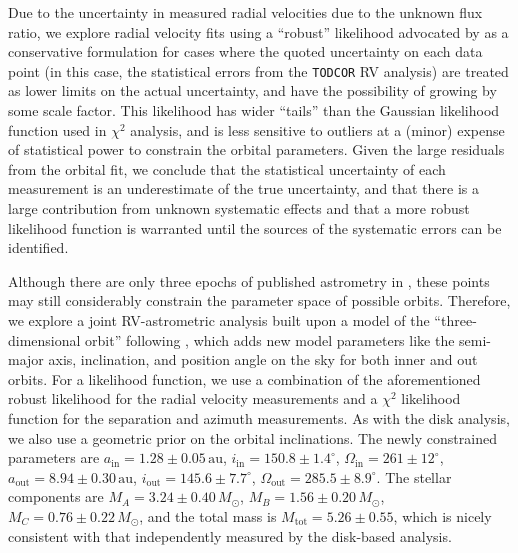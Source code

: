 \documentclass[twocolumn]{aastex61}
\begin{document}
Due to the uncertainty in measured radial velocities due to the unknown flux ratio, we explore radial velocity fits using a ``robust'' likelihood advocated by \citet[Sec. 8.3.1]{sivia06} as a conservative formulation for cases where the quoted uncertainty on each data point (in this case, the statistical errors from the \texttt{TODCOR} RV analysis) are treated as lower limits on the actual uncertainty, and have the possibility of growing by some scale factor. This likelihood has wider ``tails'' than the Gaussian likelihood function used in $\chi^2$ analysis, and is less sensitive to outliers at a (minor) expense of statistical power to constrain the orbital parameters. Given the large residuals from the orbital fit, we conclude that the statistical uncertainty of each measurement is an underestimate of the true uncertainty, and that there is a large contribution from unknown systematic effects and that a more robust likelihood function is warranted until the sources of the systematic errors can be identified.

Although there are only three epochs of published astrometry in \citet{berger11}, these points may still considerably constrain the parameter space of possible orbits. Therefore, we explore a joint RV-astrometric analysis built upon a model of the ``three-dimensional orbit'' following \citet{murray10}, which adds new model parameters like the semi-major axis, inclination, and position angle on the sky for both inner and out orbits. For a likelihood function, we use a combination of the aforementioned robust likelihood for the radial velocity measurements and a $\chi^2$ likelihood function for the separation and azimuth measurements.
As with the disk analysis, we also use a geometric prior on the orbital inclinations.
The newly constrained parameters are $a_\mathrm{in} = 1.28 \pm 0.05\,\mathrm{au}$, $i_\mathrm{in} = 150.8 \pm 1.4^\circ$, $\Omega_\mathrm{in} = 261 \pm 12^\circ$, $a_\mathrm{out} = 8.94 \pm 0.30\,\mathrm{au}$, $i_\mathrm{out} = 145.6\pm 7.7^\circ$, $\Omega_\mathrm{out} = 285.5 \pm 8.9^\circ$.
The stellar components are $M_A = 3.24 \pm 0.40\,M_\odot$, $M_B = 1.56 \pm 0.20\,M_\odot$, $M_C = 0.76\pm 0.22\,M_\odot$, and the total mass is $M_\mathrm{tot} = 5.26 \pm 0.55$, which is nicely consistent with that independently measured by the disk-based analysis.
\end{document}
